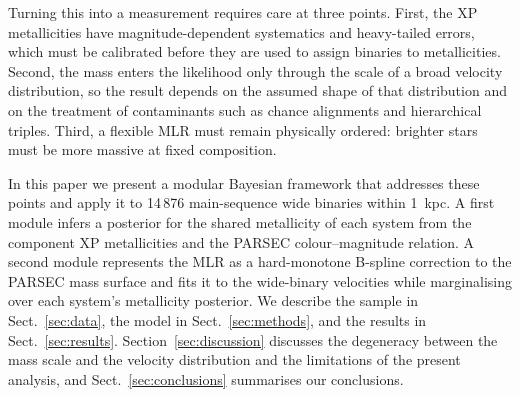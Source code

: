 Turning this into a measurement requires care at three points.  First, the XP
metallicities have magnitude-dependent systematics and heavy-tailed errors,
which must be calibrated before they are used to assign binaries to
metallicities.  Second, the mass enters the likelihood only through the scale
of a broad velocity distribution, so the result depends on the assumed shape of
that distribution and on the treatment of contaminants such as chance
alignments and hierarchical triples.  Third, a flexible MLR must remain
physically ordered: brighter stars must be more massive at fixed composition.

In this paper we present a modular Bayesian framework that addresses these
points and apply it to 14\,876 main-sequence wide binaries within 1~kpc.  A
first module infers a posterior for the shared metallicity of each system from
the component XP metallicities and the PARSEC colour--magnitude relation.  A
second module represents the MLR as a hard-monotone B-spline correction to the
PARSEC mass surface and fits it to the wide-binary velocities while
marginalising over each system's metallicity posterior.  We describe the
sample in Sect.~\ref{sec:data}, the model in Sect.~\ref{sec:methods}, and the
results in Sect.~\ref{sec:results}.  Section~\ref{sec:discussion} discusses
the degeneracy between the mass scale and the velocity distribution and the
limitations of the present analysis, and Sect.~\ref{sec:conclusions}
summarises our conclusions.
